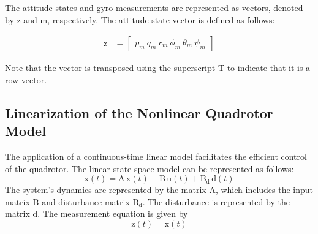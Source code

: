 \documentclass[3p,times]{elsarticle}
\begin{document}
The attitude states and gyro measurements are represented as vectors, denoted by $\boldsymbol{\mathrm{z}}$ and $\boldsymbol{\mathrm{m}}$, respectively. The attitude state vector is defined as follows:

\begin{equation}
\begin{split}
\boldsymbol{\mathrm{z}} &= \begin{bmatrix}
p_m \
q_m \
r_m \
\phi_m \
\theta_m \
\psi_m
\end{bmatrix}
\end{split}
\end{equation}

Note that the vector is transposed using the superscript $\mathrm{T}$ to indicate that it is a row vector.
\subsection{Linearization of the Nonlinear Quadrotor Model}
\noindent The application of a continuous-time linear model facilitates the efficient control of the quadrotor. The linear state-space model can be represented as follows:
\begin{equation}\label{eq:linear}
	\boldsymbol{\dot{\mathrm{x}}}(t) = \boldsymbol{\mathrm{A\,x}}(t) + \boldsymbol{\mathrm{B\,u}}(t) + \boldsymbol{\mathrm{B_{d}\,d}}(t)
\end{equation}
The system's dynamics are represented by the matrix $\boldsymbol{\mathrm{A}}$, which includes the input matrix $\boldsymbol{\mathrm{B}}$ and disturbance matrix $\boldsymbol{\mathrm{B_d}}$. The disturbance is represented by the matrix $\boldsymbol{\mathrm{d}}$.
The measurement equation is given by
\begin{equation}
	\boldsymbol{{\mathrm{z}}}(t) = \boldsymbol{\mathrm{x}}(t)
\end{equation}
\end{document}
